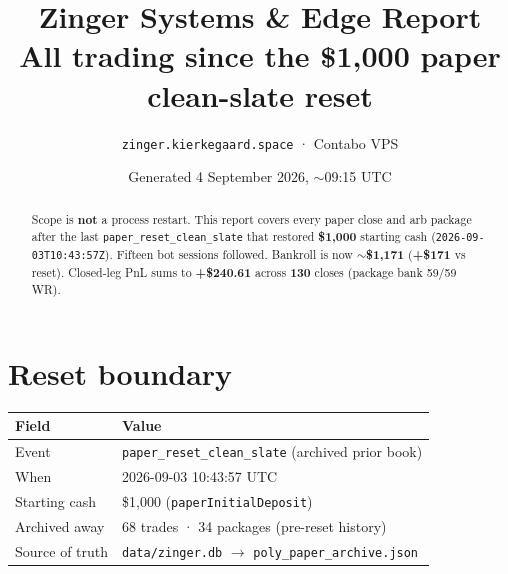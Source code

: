 \documentclass[11pt,a4paper]{article}
\title{\textbf{Zinger Systems \& Edge Report}\\[0.35em]
\large All trading since the \$1{,}000 paper clean-slate reset}
\author{\texttt{zinger.kierkegaard.space} · Contabo VPS}
\date{Generated 4 September 2026, $\sim$09:15 UTC}
\begin{document}
\maketitle
\thispagestyle{fancy}

\begin{abstract}
\noindent
Scope is \textbf{not} a process restart. This report covers every paper close and
arb package after the last \texttt{paper\_reset\_clean\_slate} that restored
\textbf{\$1{,}000} starting cash
(\texttt{2026-09-03T10:43:57Z}). Fifteen bot sessions followed. Bankroll is now
$\sim$\textbf{\$1{,}171} (\textbf{+\$171} vs reset). Closed-leg PnL sums to
\textbf{+\$240.61} across \textbf{130} closes (package bank 59/59 WR).
\end{abstract}

\section{Reset boundary}
\begin{table}[h]
\centering
\begin{tabular}{@{}lp{9.5cm}@{}}
\toprule
\textbf{Field} & \textbf{Value} \\
\midrule
Event & \texttt{paper\_reset\_clean\_slate} (archived prior book) \\
When & 2026-09-03 10:43:57 UTC \\
Starting cash & \$1{,}000 (\texttt{paperInitialDeposit}) \\
Archived away & 68 trades · 34 packages (pre-reset history) \\
Source of truth & \texttt{data/zinger.db} $\rightarrow$ \texttt{poly\_paper\_archive.json} \\
\bottomrule
\end{tabular}
\end{table}
\end{document}
